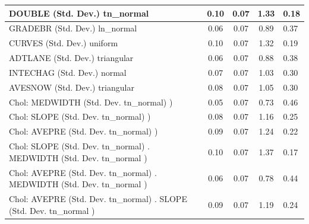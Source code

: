 \begin{table}
\begin{center}
\begin{tabular}{|l|l|c|c|c|l|}
			\hline
			DOUBLE (Std. Dev.) tn_normal &  & 0.10 & 0.07 & 1.33 & 0.18 \\
			\hline
			GRADEBR (Std. Dev.) ln_normal &  & 0.06 & 0.07 & 0.89 & 0.37 \\
			\hline
			CURVES (Std. Dev.) uniform &  & 0.10 & 0.07 & 1.32 & 0.19 \\
			\hline
			ADTLANE (Std. Dev.) triangular &  & 0.06 & 0.07 & 0.88 & 0.38 \\
			\hline
			INTECHAG (Std. Dev.) normal &  & 0.07 & 0.07 & 1.03 & 0.30 \\
			\hline
			AVESNOW (Std. Dev.) triangular &  & 0.08 & 0.07 & 1.05 & 0.30 \\
			\hline
			 Chol: MEDWIDTH (Std. Dev. tn_normal) ) &  & 0.05 & 0.07 & 0.73 & 0.46 \\
			\hline
			 Chol: SLOPE (Std. Dev. tn_normal) ) &  & 0.08 & 0.07 & 1.16 & 0.25 \\
			\hline
			 Chol: AVEPRE (Std. Dev. tn_normal) ) &  & 0.09 & 0.07 & 1.24 & 0.22 \\
			\hline
			 Chol: SLOPE (Std. Dev. tn_normal) . MEDWIDTH (Std. Dev.   tn_normal ) &  & 0.10 & 0.07 & 1.37 & 0.17 \\
			\hline
			 Chol: AVEPRE (Std. Dev. tn_normal) . MEDWIDTH (Std. Dev.   tn_normal ) &  & 0.06 & 0.07 & 0.78 & 0.44 \\
			\hline
			 Chol: AVEPRE (Std. Dev. tn_normal) . SLOPE (Std. Dev.   tn_normal ) &  & 0.09 & 0.07 & 1.19 & 0.24 \\
			\hline
		\end{tabular}
	\end{center}
\end{table}